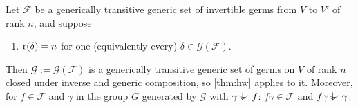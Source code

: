 \begin{theorem}\label{thm:hw-bij}
Let $\mathcal F$ be a generically transitive generic set of invertible germs from $V$
to $V'$ of rank $n$, and suppose
\begin{enumerate}[label=\textup{(F)}]
\item\label{F:rank} $\operatorname{r}(\delta)=n$ for one (equivalently every) $\delta\in\mathcal G(\mathcal F)$.
\end{enumerate}
Then $\mathcal G:=\mathcal G(\mathcal F)$ is a generically transitive generic set of germs on
$V$ of rank $n$ closed under inverse and generic composition, so \cref{thm:hw} applies to
it.  Moreover, for $f\in\mathcal F$ and $\gamma$ in the group $G$ generated by $\mathcal G$
with $\gamma\ind{}f$: $f\gamma\in\mathcal F$ and $f\gamma\ind{}\gamma$.
\end{theorem}

